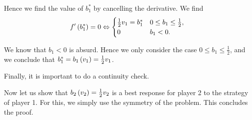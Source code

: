 Hence we find the value of $b_1^{*}$ by cancelling the derivative. We find
\begin{equation*}
    f' \left(b_1^{*}\right) = 0
    \Leftrightarrow
    \begin{cases}
       \frac{1}{2} v_1 = b_1^{*}  & 0 \leq b_1 \leq \frac{1}{2}, \\
       0 & b_1 < 0.
     \end{cases}
\end{equation*}

We know that $b_1 < 0$ is absurd. Hence we only consider the case $0 \leq b_1 \leq \frac{1}{2}$, and we conclude that $b_1^{*} = b_1 \left(v_1\right) = \frac{1}{2} v_1$.

Finally, it is important to do a continuity check.


\vspace{5mm}

Now let us show that $b_2 \left(v_2\right) = \frac{1}{2} v_2$ is a best response for player 2 to the strategy of player 1. For this, we simply use the symmetry of the problem. This concludes the proof.
